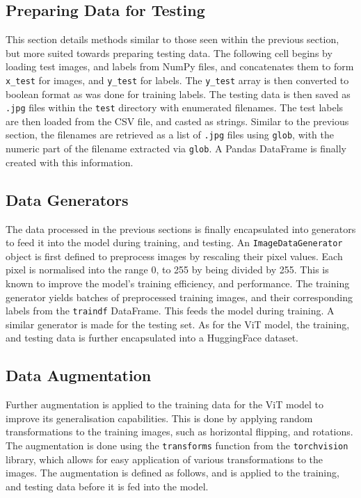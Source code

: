 \documentclass[../main]{subfiles}
\begin{document}
\subsection{Preparing Data for Testing}
This section details methods similar to those seen within the previous section,
but more suited towards preparing testing data. The following cell begins by
loading test images, and labels from NumPy files, and concatenates them to form
\texttt{x\_test} for images, and \texttt{y\_test} for labels. The
\texttt{y\_test} array is then converted to boolean format as was done for
training labels. The testing data is then saved as \texttt{.jpg} files within
the \texttt{test} directory with enumerated filenames. The test labels are then
loaded from the CSV file, and casted as strings. Similar to the previous
section, the filenames are retrieved as a list of \texttt{.jpg} files using
\texttt{glob}, with the numeric part of the filename extracted via
\texttt{glob}. A Pandas DataFrame is finally created with this information.

\subsection{Data Generators}
The data processed in the previous sections is finally encapsulated into
generators to feed it into the model during training, and testing. An
\texttt{ImageDataGenerator} object is first defined to preprocess images by
rescaling their pixel values. Each pixel is normalised into the range 0, to
255 by being divided by 255. This is known to improve the model's training
efficiency, and performance. The training generator yields batches of
preprocessed training images, and their corresponding labels from the
\texttt{traindf} DataFrame. This feeds the model during training. A similar
generator is made for the testing set. As for the ViT model, the training, and
testing data is further encapsulated into a HuggingFace dataset.

\subsection{Data Augmentation}
Further augmentation is applied to the training data for the ViT model to
improve its generalisation capabilities. This is done by applying random
transformations to the training images, such as horizontal flipping, and
rotations. The augmentation is done using the \texttt{transforms} function from
the \texttt{torchvision} library, which allows for easy application of various
transformations to the images. The augmentation is defined as follows, and is
applied to the training, and testing data before it is fed into the model.
\end{document}
